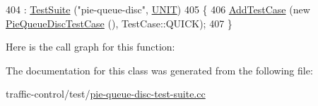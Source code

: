 \begin{DoxyCode}
404     : \hyperlink{classns3_1_1TestSuite_a904b0c40583b744d30908aeb94636d1a}{TestSuite} (\textcolor{stringliteral}{"pie-queue-disc"}, \hyperlink{classns3_1_1TestSuite_a1ebfcab34ec8161e085e8e3a1855eae0a3885375a3787abf60431f8454b3cadbd}{UNIT})
405   \{
406     \hyperlink{classns3_1_1TestCase_a3718088e3eefd5d6454569d2e0ddd835}{AddTestCase} (\textcolor{keyword}{new} \hyperlink{classPieQueueDiscTestCase}{PieQueueDiscTestCase} (), TestCase::QUICK);
407   \}
\end{DoxyCode}


Here is the call graph for this function\+:




The documentation for this class was generated from the following file\+:\begin{DoxyCompactItemize}
\item 
traffic-\/control/test/\hyperlink{pie-queue-disc-test-suite_8cc}{pie-\/queue-\/disc-\/test-\/suite.\+cc}\end{DoxyCompactItemize}
